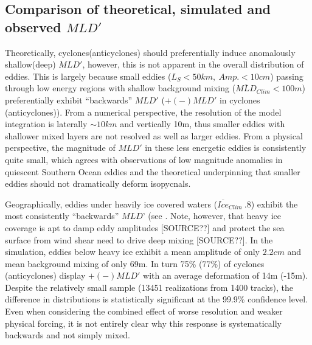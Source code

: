 \subsection{Comparison of theoretical, simulated and observed $MLD'$}

Theoretically, cyclones(anticyclones) should preferentially induce anomalously shallow(deep) $MLD'$, however, this is not apparent in the overall distribution of eddies. This is largely because small eddies ($L_S<50 km, \ Amp.<10 cm$) passing through low energy regions with shallow background mixing ($\overline{MLD}_{Clim}<100m$) preferentially exhibit ``backwards'' $MLD'$ ($+(-) MLD'$ in cyclones (anticyclones)). From a numerical perspective, the resolution of the model integration is laterally $\sim10km$ and vertically 10m, thus smaller eddies with shallower mixed layers are not resolved as well as larger eddies. From a physical perspective, the magnitude of $MLD'$ in these less energetic eddies is consistently quite small, which agrees with observations of low magnitude anomalies in quiescent Southern Ocean eddies \parencite{HausmannObservedmesoscaleeddy2017} and the theoretical underpinning that smaller eddies should not dramatically deform isopycnals. 

Geographically, eddies under heavily ice covered waters ($\overline{Ice}_{Clim}\>.8$) exhibit the most consistently ``backwards'' $MLD’$ (see . Note, however, that heavy ice coverage is apt to damp eddy amplitudes [SOURCE??] and protect the sea surface from wind shear need to drive deep mixing [SOURCE??]. In the simulation, eddies below heavy ice exhibit a mean amplitude of only $2.2cm$ and mean background mixing of only 69m. In turn 75\% (77\%) of cyclones (anticyclones) display $+(-) MLD'$ with an average deformation of 14m (-15m). Despite the relatively small sample (13451 realizations from 1400 tracks), the difference in distributions is statistically significant at the 99.9\% confidence level. Even when considering the combined effect of worse resolution and weaker physical forcing, it is not entirely clear why this response is systematically backwards and not simply mixed. 

